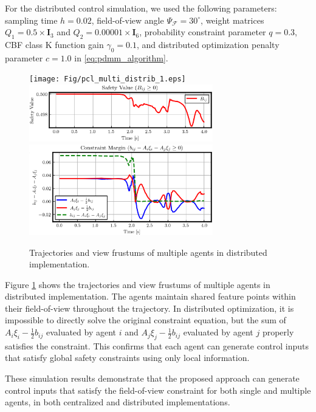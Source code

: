 \documentclass[fleqn,10pt,twocolumn]{SICE_FES25}
\theoremstyle{definition}
\theoremstyle{plain}
\begin{document}
For the distributed control simulation, we used the following parameters: sampling time $h = 0.02$, field-of-view angle $\Psi_{\mathcal{F}} = 30^{\circ}$, weight matrices $Q_1 = 0.5 \times {\mathbf{I}}_3$ and $Q_2 = 0.00001 \times {\mathbf{I}}_6$, probability constraint parameter $q = 0.3$, CBF class K function gain $\gamma_0 = 0.1$, and distributed optimization penalty parameter $c = 1.0$ in \eqref{eq:pdmm_algorithm}.

\begin{figure}[h]
\begin{center}
\texttt{[image: Fig/pcl\_multi\_distrib\_1.eps]}\\
\includegraphics[width=8.0cm]{Fig/pcl_multi_distrib_2.eps}\\
\includegraphics[width=8.0cm]{Fig/pcl_multi_distrib_3.eps}
\caption{\label{fig:distributed_trajectory} Trajectories and view frustums of multiple agents in distributed implementation.}
\vspace{-4mm}
\end{center}
\end{figure}
Figure \ref{fig:distributed_trajectory} shows the trajectories and view frustums of multiple agents in distributed implementation. The agents maintain shared feature points within their field-of-view throughout the trajectory. In distributed optimization, it is impossible to directly solve the original constraint equation, but the sum of $A_i\xi_i-\frac{1}{2}b_{ij}$ evaluated by agent $i$ and $A_j\xi_j-\frac{1}{2}b_{ij}$ evaluated by agent $j$ properly satisfies the constraint. This confirms that each agent can generate control inputs that satisfy global safety constraints using only local information.

These simulation results demonstrate that the proposed approach can generate control inputs that satisfy the field-of-view constraint for both single and multiple agents, in both centralized and distributed implementations.
\end{document}
